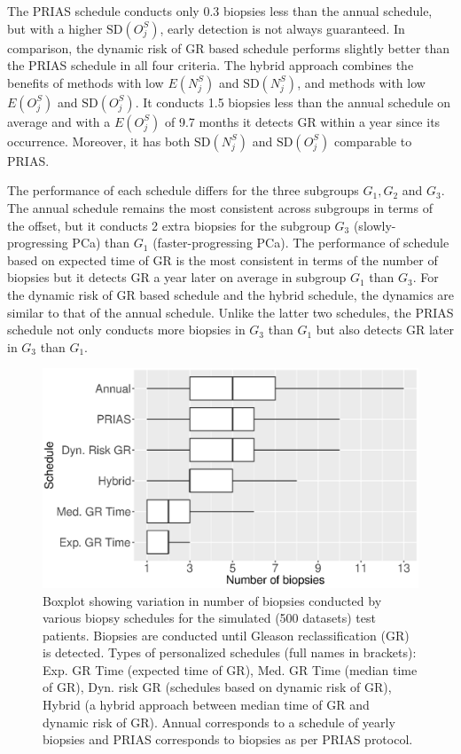The PRIAS schedule conducts only 0.3 biopsies less than the annual schedule, but with a higher $\mbox{SD}(O^S_j)$, early detection is not always guaranteed. In comparison, the dynamic risk of GR based schedule performs slightly better than the PRIAS schedule in all four criteria. The hybrid approach combines the benefits of methods with low $E(N^S_j)$ and $\mbox{SD}(N^S_j)$, and methods with low $E(O^S_j)$ and $\mbox{SD}(O^S_j)$. It conducts 1.5 biopsies less than the annual schedule on average and with a $E(O^S_j)$ of 9.7 months it detects GR within a year since its occurrence. Moreover, it has both $\mbox{SD}(N^S_j)$ and $\mbox{SD}(O^S_j)$ comparable to PRIAS.

The performance of each schedule differs for the three subgroups $G_1, G_2$ and $G_3$. The annual schedule remains the most consistent across subgroups in terms of the offset, but it conducts 2 extra biopsies for the subgroup $G_3$ (slowly-progressing PCa) than $G_1$ (faster-progressing PCa). The performance of schedule based on expected time of GR is the most consistent in terms of the number of biopsies but it detects GR a year later on average in subgroup $G_1$ than $G_3$. For the dynamic risk of GR based schedule and the hybrid schedule, the dynamics are similar to that of the annual schedule. Unlike the latter two schedules, the PRIAS schedule not only conducts more biopsies in $G_3$ than $G_1$ but also detects GR later in $G_3$ than $G_1$.

\begin{figure}[!htb]
\centerline{\includegraphics[width=\columnwidth]{nbBoxPlot_all.eps}}
\caption{Boxplot showing variation in number of biopsies conducted by various biopsy schedules for the simulated (500 datasets) test patients. Biopsies are conducted until Gleason reclassification (GR) is detected. Types of personalized schedules (full names in brackets): Exp. GR Time (expected time of GR), Med. GR Time (median time of GR), Dyn. risk GR (schedules based on dynamic risk of GR), Hybrid (a hybrid approach between median time of GR and dynamic risk of GR). Annual corresponds to a schedule of yearly biopsies and PRIAS corresponds to biopsies as per PRIAS protocol.}
\label{fig : nbBoxPlot_all}
\end{figure}

